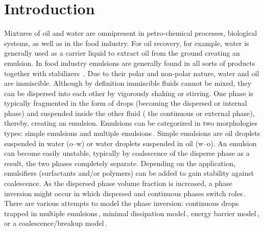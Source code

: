 \section{Introduction}%
\fi%
Mixtures of oil and water are omnipresent in petro-chemical processes,
biological systems, as well as in the food industry.
For oil recovery, for example, water is generally used as a carrier liquid to extract oil
from the ground creating an emulsion. In food industry emulsions are generally found in all sorts of products together with stabilizers \,\cite{mcClements2004}.
Due to their polar and non-polar nature, water and oil are immiscible.
Although by definition immiscible fluids cannot be mixed, they can be dispersed into each other by vigorously shaking or stirring. One phase is typically fragmented in the form of drops (becoming the dispersed or internal phase) and suspended inside the
other fluid ( the continuous or external phase), thereby, creating
an emulsion.
Emulsions can be categorized in two morphologies types: simple emulsions and multiple emulsions\,\cite{Becher2001}.
Simple emulsions are oil droplets suspended in water (o--w) or water droplets suspended in oil (w--o).
An emulsion can become easily unstable, typically by coalescence of the disperse phase
as a result, the two phases completely separate. Depending on the application, emulsifiers
(surfactants and/or polymers) can be added to gain stability against coalescence.
As the dispersed phase volume fraction is increased, a phase
inversion might occur in which dispersed and continuous phases  
switch roles\,\cite{Salager2000, Perazzo2015}.  There are various attempts to model
the phase inversion: continuous drops trapped in multiple
emulsions\,\cite{Pal1993, Jahanzad2009}, minimal dissipation
model\,\cite{Poesio2008, Ngan2009}, energy barrier model\,\cite{Piela2009}, or
a coalescence/breakup model\,\cite{Brauner2002,Yeo2002}. 
